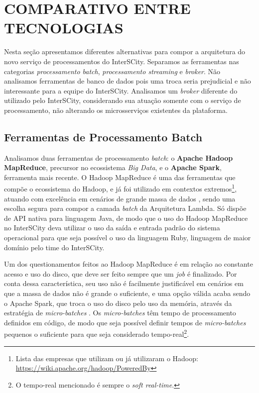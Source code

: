 \section{COMPARATIVO ENTRE TECNOLOGIAS}

Nesta seção apresentamos diferentes alternativas para compor a arquitetura do
novo serviço de processamentos do InterSCity. Separamos as ferramentas
nas categorias \textit{processamento batch}, \textit{processamento streaming}
e \textit{broker}. Não analisamos ferramentas de banco de dados pois
uma troca seria prejudicial e não interessante para a equipe do InterSCity.
Analisamos um \textit{broker} diferente do utilizado pelo InterSCity,
considerando sua atuação somente com o serviço de processamento, não alterando
os microsserviços existentes da plataforma.

\subsection{Ferramentas de Processamento Batch}

Analisamos duas ferramentas de processamento \textit{batch}: o
\textbf{Apache Hadoop MapReduce}, precursor no ecossistema \textit{Big Data},
e o \textbf{Apache Spark}, ferramenta mais recente. O Hadoop MapReduce é uma das
ferramentas que compõe o ecossistema do Hadoop, e já foi utilizado em contextos
extremos\footnote{Lista das empresas que utilizam ou já
utilizaram o Hadoop: \url{https://wiki.apache.org/hadoop/PoweredBy}}, atuando
com excelência em cenários de grande massa de dados \cite{zaharia2008}, sendo
uma escolha segura para compor a camada \textit{batch} da Arquitetura
Lambda. Só dispõe de API nativa para linguagem Java, de modo que o uso do Hadoop
MapReduce no InterSCity deva utilizar o uso da saída e entrada padrão do
sistema operacional para que seja possível o uso da linguagem Ruby, linguagem
de maior domínio pelo time do InterSCity.

Um dos questionamentos feitos ao Hadoop MapReduce é em relação ao constante acesso e
uso do disco, que deve ser feito sempre que um \textit{job} é finalizado. Por
conta dessa característica, seu uso não é facilmente justificável em cenários em
que a massa de dados não é grande o suficiente, e uma opção válida acaba sendo
o Apache Spark, que troca o uso do disco pelo uso da memória, através da estratégia
de \textit{micro-batches} \cite{arsalan2014}. Os \textit{micro-batches} têm tempo de processamento
definidos em código, de modo que seja possível definir tempos de
\textit{micro-batches} pequenos o suficiente para que seja considerado
tempo-real\footnote{O tempo-real mencionado é sempre o \textit{soft real-time}.}.

